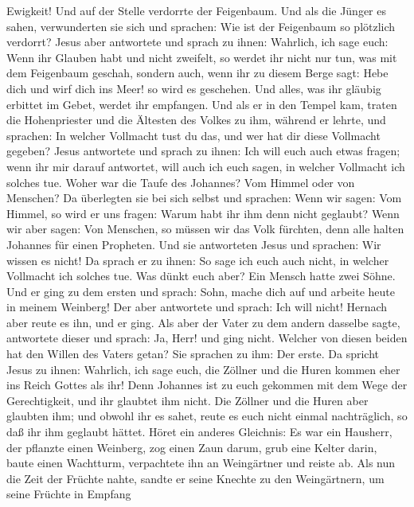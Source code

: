Ewigkeit! Und auf der Stelle verdorrte der Feigenbaum. 
Und als die Jünger es sahen, verwunderten sie sich und sprachen: Wie ist
der Feigenbaum so plötzlich verdorrt?  Jesus aber
antwortete und sprach zu ihnen: Wahrlich, ich sage euch: Wenn ihr
Glauben habt und nicht zweifelt, so werdet ihr nicht nur tun, was mit
dem Feigenbaum geschah, sondern auch, wenn ihr zu diesem Berge sagt:
Hebe dich und wirf dich ins Meer! so wird es geschehen. 
Und alles, was ihr gläubig erbittet im Gebet, werdet ihr empfangen.
 Und als er in den Tempel kam, traten die Hohenpriester
und die Ältesten des Volkes zu ihm, während er lehrte, und sprachen: In
welcher Vollmacht tust du das, und wer hat dir diese Vollmacht gegeben?
 Jesus antwortete und sprach zu ihnen: Ich will euch auch
etwas fragen; wenn ihr mir darauf antwortet, will auch ich euch sagen,
in welcher Vollmacht ich solches tue.  Woher war die
Taufe des Johannes? Vom Himmel oder von Menschen? Da überlegten sie bei
sich selbst und sprachen: Wenn wir sagen: Vom Himmel, so wird er uns
fragen: Warum habt ihr ihm denn nicht geglaubt?  Wenn wir
aber sagen: Von Menschen, so müssen wir das Volk fürchten, denn alle
halten Johannes für einen Propheten.  Und sie antworteten
Jesus und sprachen: Wir wissen es nicht! Da sprach er zu ihnen: So sage
ich euch auch nicht, in welcher Vollmacht ich solches tue.
 Was dünkt euch aber? Ein Mensch hatte zwei Söhne. Und er
ging zu dem ersten und sprach: Sohn, mache dich auf und arbeite heute in
meinem Weinberg!  Der aber antwortete und sprach: Ich
will nicht! Hernach aber reute es ihn, und er ging.  Als
aber der Vater zu dem andern dasselbe sagte, antwortete dieser und
sprach: Ja, Herr! und ging nicht.  Welcher von diesen
beiden hat den Willen des Vaters getan? Sie sprachen zu ihm: Der erste.
Da spricht Jesus zu ihnen: Wahrlich, ich sage euch, die Zöllner und die
Huren kommen eher ins Reich Gottes als ihr!  Denn
Johannes ist zu euch gekommen mit dem Wege der Gerechtigkeit, und ihr
glaubtet ihm nicht. Die Zöllner und die Huren aber glaubten ihm; und
obwohl ihr es sahet, reute es euch nicht einmal nachträglich, so daß ihr
ihm geglaubt hättet.  Höret ein anderes Gleichnis: Es war
ein Hausherr, der pflanzte einen Weinberg, zog einen Zaun darum, grub
eine Kelter darin, baute einen Wachtturm, verpachtete ihn an Weingärtner
und reiste ab.  Als nun die Zeit der Früchte nahte,
sandte er seine Knechte zu den Weingärtnern, um seine Früchte in Empfang
